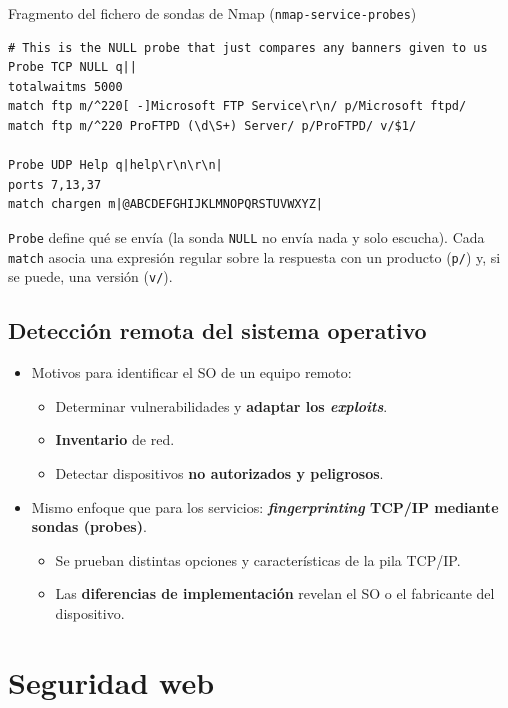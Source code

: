 \documentclass[11pt,a4paper]{report}
\begin{document}
\begin{ejemplo}{Fragmento del fichero de sondas de Nmap (\texttt{nmap-service-probes})}
\begin{verbatim}
# This is the NULL probe that just compares any banners given to us
Probe TCP NULL q||
totalwaitms 5000
match ftp m/^220[ -]Microsoft FTP Service\r\n/ p/Microsoft ftpd/
match ftp m/^220 ProFTPD (\d\S+) Server/ p/ProFTPD/ v/$1/
 
Probe UDP Help q|help\r\n\r\n|
ports 7,13,37
match chargen m|@ABCDEFGHIJKLMNOPQRSTUVWXYZ|
\end{verbatim}
\texttt{Probe} define qué se envía (la sonda \texttt{NULL} no envía nada y solo escucha). Cada \texttt{match} asocia una expresión regular sobre la respuesta con un producto (\texttt{p/}) y, si se puede, una versión (\texttt{v/}).
\end{ejemplo}
 
\section{Detección remota del sistema operativo}
 
\begin{itemize}
  \item Motivos para identificar el SO de un equipo remoto:
    \begin{itemize}
      \item Determinar vulnerabilidades y \textbf{adaptar los \emph{exploits}}.
      \item \textbf{Inventario} de red.
      \item Detectar dispositivos \textbf{no autorizados y peligrosos}.
    \end{itemize}
  \item Mismo enfoque que para los servicios: \textbf{\emph{fingerprinting} TCP/IP mediante sondas (probes)}.
    \begin{itemize}
      \item Se prueban distintas opciones y características de la pila TCP/IP.
      \item Las \textbf{diferencias de implementación} revelan el SO o el fabricante del dispositivo.
    \end{itemize}
\end{itemize}
 
\chapter{Seguridad web}
 
\end{document}
